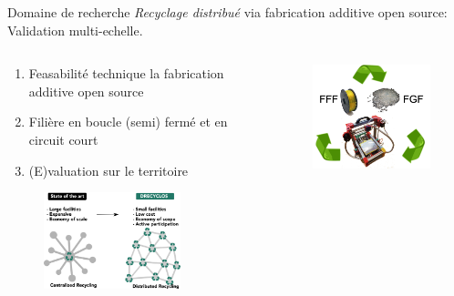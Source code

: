 \documentclass[
  11pt,
  ignorenonframetext,
  aspectratio=169,
  c]{beamer}
\providecommand{\tightlist}{%
  \setlength{\itemsep}{0pt}\setlength{\parskip}{0pt}}\usepackage{longtable,booktabs,array}
\begin{document}
\begin{frame}[t]{Domaine de recherche}
\protect\hypertarget{domaine-de-recherche-1}{}
\emph{Recyclage distribué} via fabrication additive open source:
Validation multi-echelle.

\begin{columns}[T]
\begin{column}[T]{0.65\textwidth}
\small

\begin{enumerate}
\tightlist
\item
  Feasabilité technique la fabrication additive open source
\item
  Filière en boucle (semi) fermé et en circuit court
\item
  (E)valuation sur le territoire
\end{enumerate}

\begin{figure}

{\centering \includegraphics[width=1.5625in,height=\textheight]{Figures/slides/Abstract.png}

}

\end{figure}
\end{column}

\begin{column}[T]{0.35\textwidth}
\begin{figure}

{\centering \includegraphics[width=2.08333in,height=\textheight]{Figures/slides/Recherche-Intro-01.png}

}

\end{figure}
\end{column}
\end{columns}
\end{frame}
\end{document}
